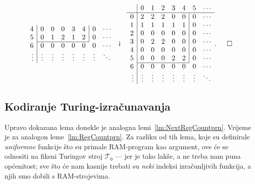 \begin{primjer}[{name=[kodirana tablica prijelaza]}]
\begin{equation}
\begin{array}{r|ccccccc}
4& 0 & 0 & 0 & 3 & 4 & \multicolumn{1}{|c}{0} & \cdots\\
5& 0 & 1 & 2 & 1 & 2 & \multicolumn{1}{|c}{0} & \cdots\\ \cline{2-6}
6& 0 & 0 & 0 & 0 & 0 & 0 & \cdots\\
\vdots&\vdots&\vdots&\vdots&\vdots&\vdots&\vdots&\ddots
\end{array}\;\text{ i }\;\;
\begin{array}{r|ccccccc}
    &0&1&2&3&4&5&\cdots\\\hline
0& 2 & 2 & 2 & 0 & 0 & \multicolumn{1}{|c}{0} & \cdots\\
1& 1 & 1 & 1 & 1 & 1 & \multicolumn{1}{|c}{0} & \cdots\\
2& 0 & 0 & 0 & 0 & 0 & \multicolumn{1}{|c}{0} & \cdots\\
3& 0 & 2 & 2 & 0 & 0 & \multicolumn{1}{|c}{0} & \cdots\\
4& 0 & 0 & 0 & 0 & 0 & \multicolumn{1}{|c}{0} & \cdots\\
5& 0 & 0 & 0 & 2 & 2 & \multicolumn{1}{|c}{0} & \cdots\\ \cline{2-6}
6& 0 & 0 & 0 & 0 & 0 & 0 & \cdots\\
\vdots&\vdots&\vdots&\vdots&\vdots&\vdots&\vdots&\ddots
\end{array}\text.\!\!\!\qedhere
\end{equation}
\end{primjer}

\subsection{Kodiranje Turing-izračunavanja}

Upravo dokazana lema donekle je analogna lemi~\ref{lm:NextRegCountprn}. Vrijeme je za analogon leme~\ref{lm:RegCountprn}. Za razliku od tih lema, koje su definirale \emph{uniformne} funkcije što su primale RAM-program kao argument, ove će se odnositi na fiksni Turingov stroj $\mathcal T_0$ --- jer je tako lakše, a ne treba nam puna općenitost; sve što će nam kasnije trebati su \emph{neki} indeksi izračunljivih funkcija, a njih smo dobili s RAM-strojevima.

